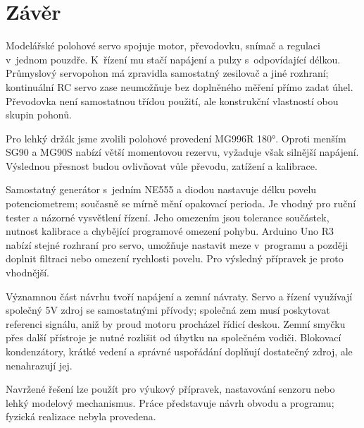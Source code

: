 \chapter{Závěr}
Modelářské polohové servo spojuje motor, převodovku, snímač a regulaci v~jednom pouzdře. K~řízení mu stačí napájení a pulzy s~odpovídající délkou. Průmyslový servopohon má zpravidla samostatný zesilovač a jiné rozhraní; kontinuální RC servo zase neumožňuje bez doplněného měření přímo zadat úhel. Převodovka není samostatnou třídou použití, ale konstrukční vlastností obou skupin pohonů.

Pro lehký držák jsme zvolili polohové provedení MG996R 180°. Oproti menším SG90 a MG90S nabízí větší momentovou rezervu, vyžaduje však silnější napájení. Výslednou přesnost budou ovlivňovat vůle převodu, zatížení a kalibrace.

Samostatný generátor s~jedním NE555 a diodou nastavuje délku povelu potenciometrem; současně se mírně mění opakovací perioda. Je vhodný pro ruční tester a názorné vysvětlení řízení. Jeho omezením jsou tolerance součástek, nutnost kalibrace a chybějící programové omezení pohybu. Arduino Uno R3 nabízí stejné rozhraní pro servo, umožňuje nastavit meze v~programu a později doplnit filtraci nebo omezení rychlosti povelu. Pro výsledný přípravek je proto vhodnější.

Významnou část návrhu tvoří napájení a zemní návraty. Servo a řízení využívají společný 5V zdroj se samostatnými přívody; společná zem musí poskytovat referenci signálu, aniž by proud motoru procházel řídicí deskou. Zemní smyčku přes další přístroje je nutné rozlišit od úbytku na společném vodiči. Blokovací kondenzátory, krátké vedení a správné uspořádání doplňují dostatečný zdroj, ale nenahrazují jej.

Navržené řešení lze použít pro výukový přípravek, nastavování senzoru nebo lehký modelový mechanismus. Práce představuje návrh obvodu a programu; fyzická realizace nebyla provedena.
